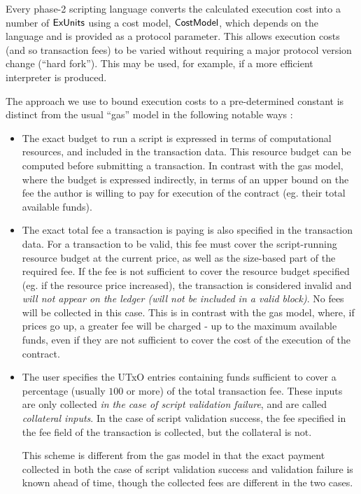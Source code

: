 Every phase-2 scripting language
converts the calculated execution cost into a number of $\mathsf{ExUnits}$ using a cost model,
$\mathsf{CostModel}$, which depends on the language and is provided as a protocol parameter.
This allows execution costs (and so transaction fees) to be varied without requiring a major protocol version change (``hard fork'').
This may be used, for example, if a more efficient interpreter is produced.

The approach we use to bound execution costs to a pre-determined constant is
distinct from the usual ``gas'' model in the following notable ways :

\begin{itemize}
  \item The exact budget to run a script is expressed in terms of computational resources,
  and included in the transaction data. This resource budget can be computed before submitting a transaction.
  In contrast with the gas model, where the budget is expressed indirectly,
  in terms of an upper bound on the fee the author is willing to pay for execution of the
  contract (eg. their total available funds).

  \item The exact total fee a transaction is paying is also specified in the transaction data.
  For a transaction to be valid, this fee must cover the script-running resource budget at the current price,
  as well as the size-based part of the required fee.
  If the fee is not sufficient to cover the resource budget specified (eg. if the resource price increased),
  the transaction is considered invalid and \emph{will not appear on the ledger (will not be included in a valid block)}.
  No fees will be collected in this case.
  This is in contrast with the gas model, where, if prices go up, a greater fee will be charged - up to
  the maximum available funds, even if they are not sufficient to cover the cost of the execution of the contract.

  \item The user specifies the UTxO entries containing funds sufficient to cover a percentage
  (usually $100$ or more) of the total transaction fee.
  These inputs are only collected \emph{in the case of script validation failure},
  and are called \emph{collateral inputs}. In the case of
  script validation success, the fee specified in the fee field of the transaction is collected,
  but the collateral is not.

  This scheme is different from the gas model in that the exact payment collected in
  both the case of script validation success and validation failure is known ahead of time,
  though the collected fees are different in the two cases.
\end{itemize}

